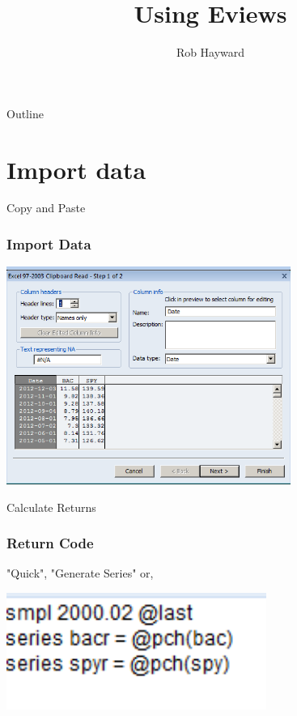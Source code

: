 \documentclass[14pt,xcolor=pdftex,dvipsnames,table]{beamer}\usepackage{graphicx, color}
\title{Using Eviews}
\author{Rob Hayward}
\begin{document}
\begin{frame}
\titlepage
\end{frame}

\begin{frame}{Outline}
\tableofcontents
\end{frame}

\section{Import data}
\begin{frame}{Copy and Paste}
\graphicspath{{./Figures/}}
\frametitle{Import Data}
\begin{center}
\includegraphics[height = 2.8in]{Import}
\end{center}
\end{frame} 


\begin{frame}{Calculate Returns}
\graphicspath{{./Figures/}}
\frametitle{Return Code}
"Quick", "Generate Series" or, 
\begin{center}
\includegraphics[height = 1.5in]{Returncode}
\end{center}
\end{frame} 
\end{document}
